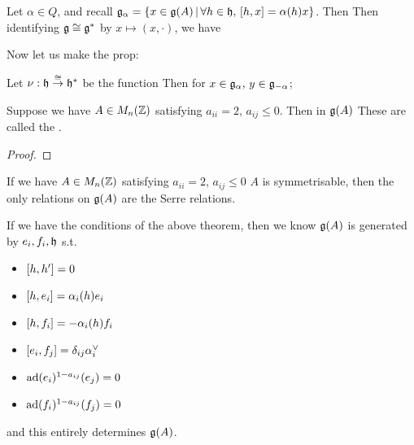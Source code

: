 \documentclass{article}
\begin{document}
\begin{corollary}
Let $\alpha \in Q$, and recall $\mf{g}_\alpha = \pbrace{x \in \mf{g}(A) \, | \, \forall h \in \mf{h}, \, \comm[h]{x} = \alpha(h)x}$. Then 
Then identifying $\mf{g}\cong \mf{g}^\ast$ by $x \mapsto (x,\cdot)$, we have 
\end{corollary}

Now let us make the prop:

\begin{prop}
Let $\nu : \mf{h} \overset{\cong}{\to} \mf{h}^\ast$ be the function 
Then for $x \in \mf{g}_\alpha, \, y \in \mf{g}_{-\alpha}$;
\end{prop}

\begin{theorem}[Serre]
Suppose we have $A \in M_n(\mbb{Z})$ satisfying $a_{ii} = 2, \, a_{ij} \leq 0$. Then in $\mf{g}(A)$
These are called the . 
\end{theorem}
\begin{proof}

\end{proof}

\begin{theorem}
If we have $A \in M_n(\mbb{Z})$ satisfying $a_{ii} = 2, \, a_{ij} \leq 0$  $A$ is symmetrisable, then the only relations on $\mf{g}(A)$ are the Serre relations. 
\end{theorem}

\begin{remark}
If we have the conditions of the above theorem, then we know $\mf{g}(A)$ is generated by $e_i, f_i, \mf{h}$ s.t. 
\begin{itemize}
    \item $\comm[h]{h^\prime} = 0$
    \item $\comm[h]{e_i} = \alpha_i(h) e_i$ 
    \item $\comm[h]{f_i} = -\alpha_i(h) f_i$ 
    \item $\comm[e_i]{f_j} = \delta_{ij} \alpha_i^\vee$
    \item $\ad(e_i)^{1-a_{ij}}(e_j) = 0$
    \item $\ad(f_i)^{1-a_{ij}}(f_j) = 0$
\end{itemize}
and this entirely determines $\mf{g}(A)$. 
\end{remark}
\end{document}
